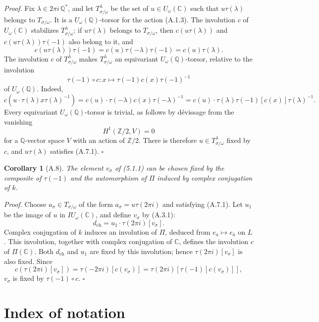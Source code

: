 \documentclass[10pt,a4paper]{article}
\newcommand{\Q}{\mathbb Q}
\newcommand{\C}{\mathbb C}
\theoremstyle{deligne}
\newtheorem*{corollary*}{Corollary}
\newenvironment{proofdel}{\textit{Proof.}}{\hfill$\square$}
\begin{document}
\begin{proofdel}
Fix \(\lambda\in2\pi i\,\Q^*\), and let \(T^\lambda_{\sigma/\omega}\) be the set of \(u\in U_\omega(\C)\) such that \(u\tau(\lambda)\) belongs to \(T_{\sigma/\omega}\). It is a \(U_\omega(\Q)\)-torsor for the action (A.1.3). The involution \(c\) of \(U_\omega(\C)\) stabilizes \(T^\lambda_{\sigma/\omega}\): if \(u\tau(\lambda)\) belongs to \(T_{\sigma/\omega}\), then \(c(u\tau(\lambda))\) and \(c(u\tau(\lambda))\tau(-1)\) also belong to it, and
\[
c(u\tau(\lambda))\tau(-1)=c(u)\tau(-\lambda)\tau(-1)=c(u)\tau(\lambda).
\]
The involution \(c\) of \(T^\lambda_{\sigma/\omega}\) makes \(T^\lambda_{\sigma/\omega}\) an equivariant \(U_\omega(\Q)\)-torsor, relative to the involution
\[
\tau(-1)\circ c:x\longmapsto\tau(-1)c(x)\tau(-1)^{-1}
\]
of \(U_\omega(\Q)\). Indeed,
\[
c(u\cdot\tau(\lambda)x\tau(\lambda)^{-1})
=c(u)\cdot\tau(-\lambda)c(x)\tau(-\lambda)^{-1}
=c(u)\cdot\tau(\lambda)\tau(-1)[c(x)]\tau(\lambda)^{-1}.
\]
Every equivariant \(U_\omega(\Q)\)-torsor is trivial, as follows by dévissage from the vanishing
\[
H^1(\mathbb Z/2,V)=0
\]
for a \(\Q\)-vector space \(V\) with an action of \(\mathbb Z/2\). There is therefore \(u\in T^\lambda_{\sigma/\omega}\) fixed by \(c\), and \(u\tau(\lambda)\) satisfies (A.7.1).
\end{proofdel}

\begin{corollary*}[A.8]
The element \(v_\sigma\) of (5.1.1) can be chosen fixed by the composite of \(\tau(-1)\) and the automorphism of \(\Pi\) induced by complex conjugation of \(k\).
\end{corollary*}

\begin{proofdel}
Choose \(a_\sigma\in T_{\sigma/\omega}\) of the form \(a_\sigma=u\tau(2\pi i)\) and satisfying (A.7.1). Let \(u_1\) be the image of \(u\) in \(IU_\omega(\C)\), and define \(v_\sigma\) by (A.3.1):
\[
d_{\mathrm{ch}}=u_1\cdot\tau(2\pi i)[v_\sigma].
\]
Complex conjugation of \(k\) induces an involution of \(\Pi\), deduced from \(e_a\mapsto e_{\bar a}\) on \(L\). This involution, together with complex conjugation of \(\C\), defines the involution \(c\) of \(\Pi(\C)\). Both \(d_{\mathrm{ch}}\) and \(u_1\) are fixed by this involution; hence \(\tau(2\pi i)[v_\sigma]\) is also fixed. Since
\[
c(\tau(2\pi i)[v_\sigma])=\tau(-2\pi i)[c(v_\sigma)]
=\tau(2\pi i)[\tau(-1)[c(v_\sigma)]],
\]
\(v_\sigma\) is fixed by \(\tau(-1)\circ c\).
\end{proofdel}

\section*{Index of notation}
\end{document}
